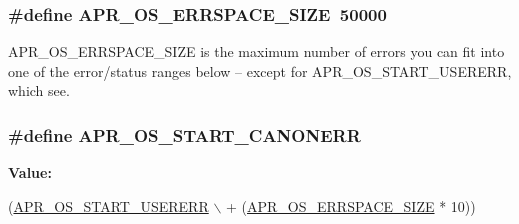 \hypertarget{group__apr__errno_gadb8d97e6836ccdc57b43b6119a5acccf}{
\subsubsection[{A\-P\-R\-\_\-\-O\-S\-\_\-\-E\-R\-R\-S\-P\-A\-C\-E\-\_\-\-S\-I\-Z\-E}]{\setlength{\rightskip}{0pt plus 5cm}\#define A\-P\-R\-\_\-\-O\-S\-\_\-\-E\-R\-R\-S\-P\-A\-C\-E\-\_\-\-S\-I\-Z\-E~50000}}\label{group__apr__errno_gadb8d97e6836ccdc57b43b6119a5acccf}
A\-P\-R\-\_\-\-O\-S\-\_\-\-E\-R\-R\-S\-P\-A\-C\-E\-\_\-\-S\-I\-Z\-E is the maximum number of errors you can fit into one of the error/status ranges below -- except for A\-P\-R\-\_\-\-O\-S\-\_\-\-S\-T\-A\-R\-T\-\_\-\-U\-S\-E\-R\-E\-R\-R, which see. \hypertarget{group__apr__errno_ga7bca957c11b80b31cb54b0d2cbe9e025}{
\subsubsection[{A\-P\-R\-\_\-\-O\-S\-\_\-\-S\-T\-A\-R\-T\-\_\-\-C\-A\-N\-O\-N\-E\-R\-R}]{\setlength{\rightskip}{0pt plus 5cm}\#define A\-P\-R\-\_\-\-O\-S\-\_\-\-S\-T\-A\-R\-T\-\_\-\-C\-A\-N\-O\-N\-E\-R\-R}}\label{group__apr__errno_ga7bca957c11b80b31cb54b0d2cbe9e025}
{\bfseries Value\-:}
\begin{DoxyCode}
(\hyperlink{group__apr__errno_gacd35b2de1e38a1fa4717e38d5e153571}{APR\_OS\_START\_USERERR} \(\backslash\)
                                 + (\hyperlink{group__apr__errno_gadb8d97e6836ccdc57b43b6119a5acccf}{APR\_OS\_ERRSPACE\_SIZE} * 10))
\end{DoxyCode}
